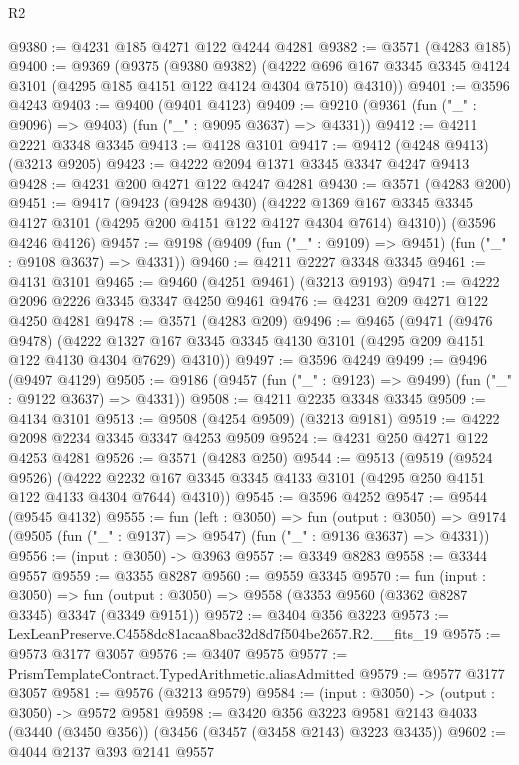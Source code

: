 \begin{lexlean}{R2}
\begin{coremodule}
@9380 := @4231 @185 @4271 @122 @4244 @4281
@9382 := @3571 (@4283 @185)
@9400 := @9369
    (@9375
      (@9380 @9382)
      (@4222 @696 @167 @3345 @3345 @4124 @3101 (@4295 @185 @4151 @122 @4124 @4304 @7510) @4310))
@9401 := @3596 @4243
@9403 := @9400 (@9401 @4123)
@9409 := @9210 (@9361 (fun ("_" : @9096) => @9403) (fun ("_" : @9095 @3637) => @4331))
@9412 := @4211 @2221 @3348 @3345
@9413 := @4128 @3101
@9417 := @9412 (@4248 @9413) (@3213 @9205)
@9423 := @4222 @2094 @1371 @3345 @3347 @4247 @9413
@9428 := @4231 @200 @4271 @122 @4247 @4281
@9430 := @3571 (@4283 @200)
@9451 := @9417
    (@9423
      (@9428 @9430)
      (@4222 @1369 @167 @3345 @3345 @4127 @3101 (@4295 @200 @4151 @122 @4127 @4304 @7614) @4310))
    (@3596 @4246 @4126)
@9457 := @9198 (@9409 (fun ("_" : @9109) => @9451) (fun ("_" : @9108 @3637) => @4331))
@9460 := @4211 @2227 @3348 @3345
@9461 := @4131 @3101
@9465 := @9460 (@4251 @9461) (@3213 @9193)
@9471 := @4222 @2096 @2226 @3345 @3347 @4250 @9461
@9476 := @4231 @209 @4271 @122 @4250 @4281
@9478 := @3571 (@4283 @209)
@9496 := @9465
    (@9471
      (@9476 @9478)
      (@4222 @1327 @167 @3345 @3345 @4130 @3101 (@4295 @209 @4151 @122 @4130 @4304 @7629) @4310))
@9497 := @3596 @4249
@9499 := @9496 (@9497 @4129)
@9505 := @9186 (@9457 (fun ("_" : @9123) => @9499) (fun ("_" : @9122 @3637) => @4331))
@9508 := @4211 @2235 @3348 @3345
@9509 := @4134 @3101
@9513 := @9508 (@4254 @9509) (@3213 @9181)
@9519 := @4222 @2098 @2234 @3345 @3347 @4253 @9509
@9524 := @4231 @250 @4271 @122 @4253 @4281
@9526 := @3571 (@4283 @250)
@9544 := @9513
    (@9519
      (@9524 @9526)
      (@4222 @2232 @167 @3345 @3345 @4133 @3101 (@4295 @250 @4151 @122 @4133 @4304 @7644) @4310))
@9545 := @3596 @4252
@9547 := @9544 (@9545 @4132)
@9555 := fun (left : @3050) =>
  fun (output : @3050) =>
  @9174 (@9505 (fun ("_" : @9137) => @9547) (fun ("_" : @9136 @3637) => @4331))
@9556 := (input : @3050) -> @3963
@9557 := @3349 @8283
@9558 := @3344 @9557
@9559 := @3355 @8287
@9560 := @9559 @3345
@9570 := fun (input : @3050) =>
  fun (output : @3050) => @9558 (@3353 @9560 (@3362 @8287 @3345) @3347 (@3349 @9151))
@9572 := @3404 @356 @3223
@9573 := LexLeanPreserve.C4558dc81acaa8bac32d8d7f504be2657.R2.__fits_19
@9575 := @9573 @3177 @3057
@9576 := @3407 @9575
@9577 := PrismTemplateContract.TypedArithmetic.aliasAdmitted
@9579 := @9577 @3177 @3057
@9581 := @9576 (@3213 @9579)
@9584 := (input : @3050) -> (output : @3050) -> @9572 @9581
@9598 := @3420
    @356
    @3223
    @9581
    @2143
    @4033
    (@3440 (@3450 @356))
    (@3456 (@3457 (@3458 @2143) @3223 @3435))
@9602 := @4044 @2137 @393 @2141 @9557

\end{coremodule}
\end{lexlean}
